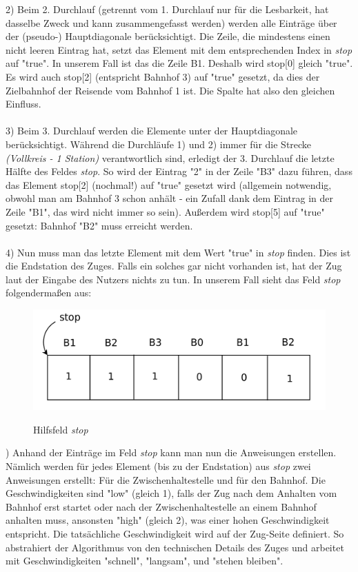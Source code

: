 2) Beim 2. Durchlauf (getrennt vom 1. Durchlauf nur für die Lesbarkeit, hat dasselbe Zweck und kann zusammengefasst werden) werden alle Einträge über der (pseudo-) Hauptdiagonale berücksichtigt. Die Zeile, die mindestens einen nicht leeren Eintrag hat, setzt das Element mit dem entsprechenden Index in \textit{stop} auf "true". In unserem Fall ist das die Zeile B1. Deshalb wird stop[0] gleich "true". Es wird auch stop[2] (entspricht Bahnhof 3) auf "true" gesetzt, da dies der Zielbahnhof der Reisende vom Bahnhof 1 ist. Die Spalte hat also den gleichen Einfluss.\\
\\
3) Beim 3. Durchlauf werden die Elemente unter der Hauptdiagonale berücksichtigt. Während die Durchläufe 1) und 2) immer für die Strecke \textit{(Vollkreis - 1 Station)} verantwortlich sind, erledigt der 3. Durchlauf die letzte Hälfte des Feldes \textit{stop}. So wird der Eintrag "2" in der Zeile "B3" dazu führen, dass das Element stop[2] (nochmal!) auf "true" gesetzt wird (allgemein notwendig, obwohl man am Bahnhof 3 schon anhält - ein Zufall dank dem Eintrag in der Zeile "B1", das wird nicht immer so sein). Außerdem wird stop[5] auf "true" gesetzt: Bahnhof "B2" muss erreicht werden.\\
\\
4) Nun muss man das letzte Element mit dem Wert "true" in \textit{stop} finden. Dies ist die Endstation des Zuges. Falls ein solches gar nicht vorhanden ist, hat der Zug laut der Eingabe des Nutzers nichts zu tun. In unserem Fall sieht das Feld \textit{stop} folgendermaßen aus:\\
\begin{figure}[H]	
\caption{Hilfsfeld \textit{stop}}
\includegraphics[width=2\textwidth, width=290pt]{content/images/stop1.png}
\label{pic:stop1}
\end{figure}
) Anhand der Einträge im Feld \textit{stop} kann man nun die Anweisungen erstellen. Nämlich werden für jedes Element (bis zu der Endstation) aus \textit{stop} zwei Anweisungen erstellt: Für die Zwischenhaltestelle und für den Bahnhof. Die Geschwindigkeiten sind "low" (gleich 1), falls der Zug nach dem Anhalten vom Bahnhof erst startet oder nach der Zwischenhaltestelle an einem Bahnhof anhalten muss, ansonsten "high" (gleich 2), was einer hohen Geschwindigkeit entspricht. Die tatsächliche Geschwindigkeit wird auf der Zug-Seite definiert. So abstrahiert der Algorithmus von den technischen Details des Zuges und arbeitet mit Geschwindigkeiten "schnell", "langsam", und "stehen bleiben".\\
